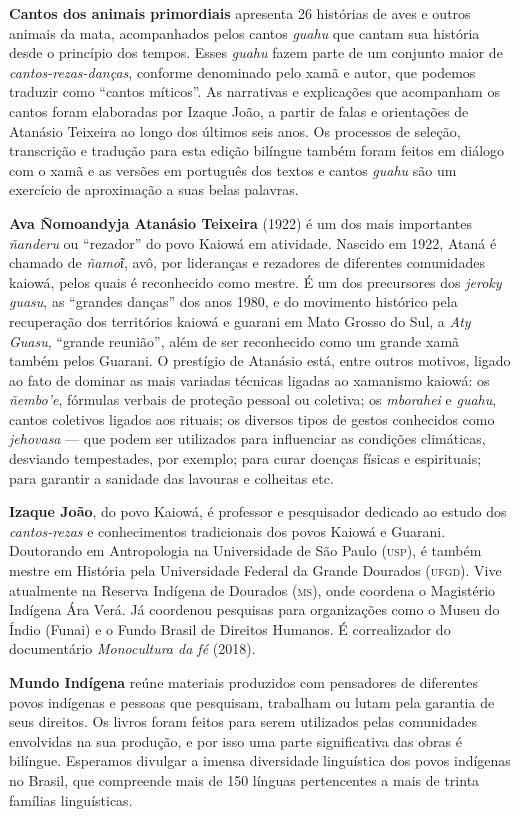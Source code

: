 \textbf{Cantos dos animais primordiais} apresenta 26 histórias de aves e outros animais da
mata, acompanhados pelos cantos \textit{guahu} que cantam sua história
desde o princípio dos tempos. Esses \textit{guahu} fazem parte de um
conjunto maior de \textit{cantos-rezas-danças}, conforme denominado pelo xamã e autor, que podemos traduzir como ``cantos míticos''. As
narrativas e explicações que acompanham os cantos foram elaboradas por
Izaque João, a partir de falas e orientações de Atanásio Teixeira ao
longo dos últimos seis anos. Os processos de seleção, transcrição e
tradução para esta edição bilíngue também foram feitos em diálogo com o
xamã e as versões em português dos textos e cantos \textit{guahu} são um
exercício de aproximação a suas belas palavras.

\textbf{Ava Ñomoandyja Atanásio Teixeira} (1922) é um dos mais importantes \textit{ñanderu} ou ``rezador'' do povo Kaiowá em atividade. Nascido em 1922, Ataná é chamado de \textit{ñamoῖ}, avô, por lideranças e rezadores de diferentes comunidades kaiowá, pelos quais é reconhecido como mestre. É um dos precursores dos \textit{jeroky guasu}, as ``grandes danças'' dos anos 1980, e do movimento histórico pela recuperação dos territórios kaiowá e guarani em Mato Grosso do Sul, a \textit{Aty Guasu}, ``grande reunião'', além de ser reconhecido como um grande xamã também pelos Guarani. O prestígio de Atanásio está, entre outros motivos, ligado ao fato de dominar as mais variadas técnicas ligadas ao xamanismo kaiowá: os \textit{ñembo'e}, fórmulas verbais de proteção pessoal ou coletiva; os \textit{mborahei} e \textit{guahu}, cantos coletivos ligados aos rituais; os diversos tipos de gestos conhecidos como \textit{jehovasa} --- que podem ser utilizados para influenciar as condições climáticas, desviando tempestades, por exemplo; para curar doenças físicas e espirituais; para garantir a sanidade das lavouras e colheitas etc.

\textbf{Izaque João}, do povo Kaiowá, é professor e pesquisador dedicado ao estudo dos \textit{cantos-rezas} e conhecimentos tradicionais dos povos Kaiowá e Guarani. Doutorando em
Antropologia na Universidade de São Paulo (\textsc{usp}), é também mestre em História pela
Universidade Federal da Grande Dourados (\textsc{ufgd}). Vive atualmente na Reserva
Indígena de Dourados (\textsc{ms}), onde coordena o Magistério Indígena Ára Verá. Já
coordenou pesquisas para organizações como o Museu do Índio (Funai) e o Fundo
Brasil de Direitos Humanos. É correalizador do documentário \textit{Monocultura da fé} (2018).

\textbf{Mundo Indígena} reúne materiais produzidos com pensadores de diferentes povos indígenas e pessoas que pesquisam, trabalham ou lutam pela garantia de seus direitos. Os livros foram feitos para serem utilizados pelas comunidades envolvidas na sua produção, e por isso uma parte significativa das obras é bilíngue. Esperamos divulgar a imensa diversidade linguística dos povos indígenas no Brasil, que compreende mais de 150 línguas pertencentes a mais de trinta famílias linguísticas.



